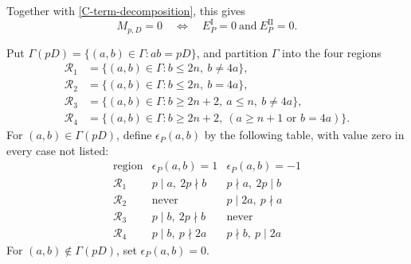 \documentclass[11pt,a4paper]{amsart}
\theoremstyle{plain}
\numberwithin{equation}{section}
\begin{document}
Together with \eqref{C-term-decomposition}, this gives
\begin{equation}\label{C-type-split-zero}
M_{p,D}=0
\quad\Longleftrightarrow\quad
E_P^{\mathrm{I}}=0
\ \text{and}\
E_P^{\mathrm{II}}=0.
\end{equation}

Put \(\Gamma(pD)=\{(a,b)\in\Gamma:ab=pD\}\), and partition
\(\Gamma\) into the four regions
\[
\begin{aligned}
 \mathcal R_1&=\{(a,b)\in\Gamma:b\le2n,\ b\ne4a\},\\
 \mathcal R_2&=\{(a,b)\in\Gamma:b\le2n,\ b=4a\},\\
 \mathcal R_3&=\{(a,b)\in\Gamma:b\ge2n+2,\ a\le n,\ b\ne4a\},\\
 \mathcal R_4&=\{(a,b)\in\Gamma:b\ge2n+2,\
                 (a\ge n+1\text{ or }b=4a)\}.
\end{aligned}
\]
For \((a,b)\in\Gamma(pD)\), define \(\epsilon_P(a,b)\) by
the following table, with value zero in every case not listed:
\begin{equation}\label{eq:C-pointwise-delta}
\begin{array}{c|c|c}
\text{region}&\epsilon_P(a,b)=1&\epsilon_P(a,b)=-1\\ \hline
\mathcal R_1&p\mid a,\ 2p\nmid b&p\nmid a,\ 2p\mid b\\
\mathcal R_2&\text{never}&p\mid2a,\ p\nmid a\\
\mathcal R_3&p\mid b,\ 2p\nmid b&\text{never}\\
\mathcal R_4&p\mid b,\ p\nmid2a&p\nmid b,\ p\mid2a
\end{array}
\end{equation}
For \((a,b)\notin\Gamma(pD)\), set \(\epsilon_P(a,b)=0\).
\end{document}
